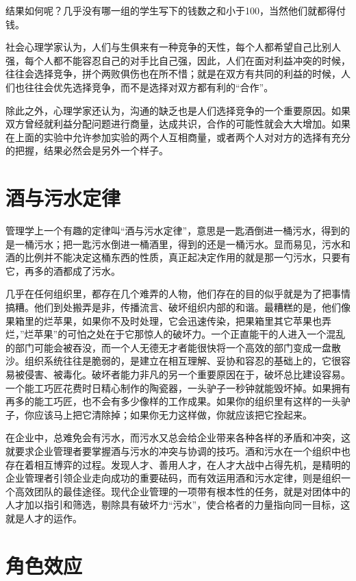 \documentclass[11pt]{ctexart}
\begin{document}
结果如何呢？几乎没有哪一组的学生写下的钱数之和小于100，当然他们就都得付钱。

社会心理学家认为，人们与生俱来有一种竞争的天性，每个人都希望自己比别人强，每个人都不能容忍自己的对手比自己强，因此，人们在面对利益冲突的时候，往往会选择竞争，拼个两败俱伤也在所不惜；就是在双方有共同的利益的时候，人们也往往会优先选择竞争，而不是选择对双方都有利的“合作”。

除此之外，心理学家还认为，沟通的缺乏也是人们选择竞争的一个重要原因。如果双方曾经就利益分配问题进行商量，达成共识，合作的可能性就会大大增加。如果在上面的实验中允许参加实验的两个人互相商量，或者两个人对对方的选择有充分的把握，结果必然会是另外一个样子。
\section{酒与污水定律}
\label{sec-57}


管理学上一个有趣的定律叫“酒与污水定律”，意思是一匙酒倒进一桶污水，得到的是一桶污水；把一匙污水倒进一桶酒里，得到的还是一桶污水。显而易见，污水和酒的比例并不能决定这桶东西的性质，真正起决定作用的就是那一勺污水，只要有它，再多的酒都成了污水。

几乎在任何组织里，都存在几个难弄的人物，他们存在的目的似乎就是为了把事情搞糟。他们到处搬弄是非，传播流言、破坏组织内部的和谐。最糟糕的是，他们像果箱里的烂苹果，如果你不及时处理，它会迅速传染，把果箱里其它苹果也弄烂，''烂苹果''的可怕之处在于它那惊人的破坏力。一个正直能干的人进入一个混乱的部门可能会被吞没，而一个人无德无才者能很快将一个高效的部门变成一盘散沙。组织系统往往是脆弱的，是建立在相互理解、妥协和容忍的基础上的，它很容易被侵害、被毒化。破坏者能力非凡的另一个重要原因在于，破坏总比建设容易。一个能工巧匠花费时日精心制作的陶瓷器，一头驴子一秒钟就能毁坏掉。如果拥有再多的能工巧匠，也不会有多少像样的工作成果。如果你的组织里有这样的一头驴子，你应该马上把它清除掉；如果你无力这样做，你就应该把它拴起来。

在企业中，总难免会有污水，而污水又总会给企业带来各种各样的矛盾和冲突，这就要求企业管理者要掌握酒与污水的冲突与协调的技巧。酒和污水在一个组织中也存在着相互博弈的过程。发现人才、善用人才，在人才大战中占得先机，是精明的企业管理者引领企业走向成功的重要砝码，而有效运用酒和污水定律，则是组织一个高效团队的最佳途径。现代企业管理的一项带有根本性的任务，就是对团体中的人才加以指引和筛选，剔除具有破坏力“污水”，使合格者的力量指向同一目标，这就是人才的运作。
\section{角色效应}
\label{sec-58}
\end{document}
